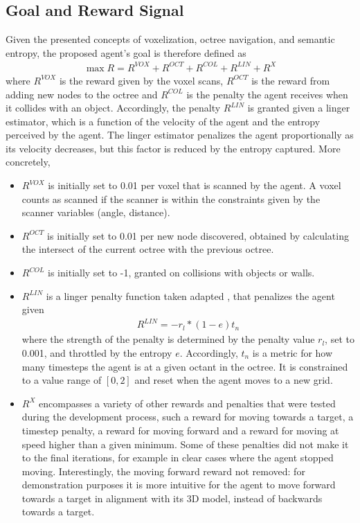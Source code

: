 \subsection{Goal and Reward Signal} \label{chap:3:reward-signal}
Given the presented concepts of voxelization, octree navigation, and semantic entropy, the proposed agent's goal is therefore defined as
\begin{align*}
    \max R = R^{VOX} + R^{OCT} + R^{COL} + R^{LIN} + R^{X} 
\end{align*}
where $R^{VOX}$ is the reward given by the voxel scans, $R^{OCT}$ is the reward from adding new nodes to the octree and $R^{COL}$ is the penalty the agent receives when it collides with an object. Accordingly, the penalty $R^{LIN}$ is granted given a linger estimator, which is a function of the velocity of the agent and the entropy perceived by the agent. The linger estimator penalizes the agent proportionally as its velocity decreases, but this factor is reduced by the entropy captured. More concretely, 
\begin{itemize}
    \item $R^{VOX}$ is initially set to 0.01 per voxel that is scanned by the agent. A voxel counts as scanned if the scanner is within the constraints given by the scanner variables (angle, distance).
    \item $R^{OCT}$ is initially set to 0.01 per new node discovered, obtained by calculating the intersect of the current octree with the previous octree.
    \item $R^{COL}$ is initially set to -1, granted on collisions with objects or walls.
    \item $R^{LIN}$ is a linger penalty function taken adapted \cite{github-mbaske-explorer-drone}, that penalizes the agent given 
        \begin{align*}
        R^{LIN} = -r_l * (1-e) t_n
        \end{align*}
    where 
    the strength of the penalty is determined by the penalty value $r_l$, set to 0.001, and throttled by the entropy $e$. %
    Accordingly, $t_n$ is a metric for how many timesteps the agent is at a given octant in the octree. It is constrained to a value range of $[0,2]$ and 
    reset when the agent moves to a new grid. 
    \item $R^{X}$ encompasses a variety of other rewards and penalties that were tested during the development process, such a reward for moving towards a target, a timestep penalty, a reward for moving forward and a reward for moving at speed higher than a given minimum. Some of these penalties did not make it to the final iterations, for example in clear cases where the agent stopped moving. Interestingly, the moving forward reward not removed: for demonstration purposes it is more intuitive for the agent to move forward towards a target in alignment with its 3D model, instead of backwards towards a target.
\end{itemize}

